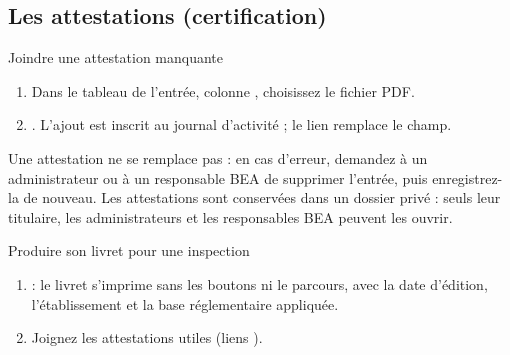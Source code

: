 \documentclass[11pt,a4paper]{article}
\begin{document}
\subsection{Les attestations (certification)}
\begin{procedure}{Joindre une attestation manquante}
\begin{enumerate}
  \item Dans le tableau de l'entrée, colonne , choisissez
    le fichier PDF.
  \item {}. L'ajout est inscrit au journal d'activité ; le lien
     remplace le champ.
\end{enumerate}
\end{procedure}
Une attestation ne se remplace pas : en cas d'erreur, demandez à un
administrateur ou à un responsable BEA de supprimer l'entrée, puis
enregistrez-la de nouveau. Les attestations sont conservées dans un dossier
privé : seuls leur titulaire, les administrateurs et les responsables BEA
peuvent les ouvrir.

\begin{procedure}{Produire son livret pour une inspection}
\begin{enumerate}
  \item {} : le livret s'imprime sans les boutons ni le
    parcours, avec la date d'édition, l'établissement et la base
    réglementaire appliquée.
  \item Joignez les attestations utiles (liens ).
\end{enumerate}
\end{procedure}
\end{document}
